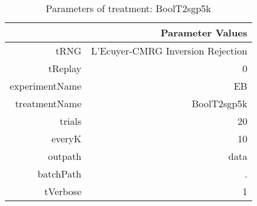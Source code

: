 \begin{table}[ht]
\centering
\begin{tabular}{rr}
  \hline
 & Parameter Values \\ 
  \hline
tRNG & L'Ecuyer-CMRG Inversion Rejection \\ 
  tReplay & 0 \\ 
  experimentName & EB \\ 
  treatmentName & BoolT2sgp5k \\ 
  trials & 20 \\ 
  everyK & 10 \\ 
  outpath & data \\ 
  batchPath & . \\ 
  tVerbose & 1 \\ 
   \hline
\end{tabular}
\caption{ Parameters of treatment: BoolT2sgp5k 
} 
\end{table}
